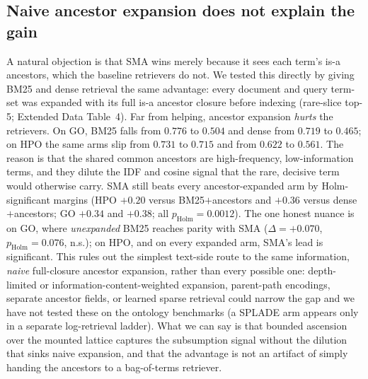\documentclass[pdflatex,sn-nature]{sn-jnl}
\begin{document}
\subsection{Naive ancestor expansion does not explain the gain}
 A natural
objection is that SMA wins merely because it sees each term's is-a ancestors,
which the baseline retrievers do not. We tested this directly by giving BM25 and
dense retrieval the same advantage: every document and query term-set was
expanded with its full is-a ancestor closure before indexing
(rare-slice top-5; Extended Data Table~4). Far from helping, ancestor expansion
\emph{hurts} the retrievers. On GO, BM25 falls from $0.776$ to $0.504$ and dense
from $0.719$ to $0.465$; on HPO the same arms slip from $0.731$ to $0.715$ and
from $0.622$ to $0.561$. The reason is that the shared common ancestors are
high-frequency, low-information terms, and they dilute the IDF and cosine signal
that the rare, decisive term would otherwise carry. SMA still beats every
ancestor-expanded arm by Holm-significant margins (HPO $+0.20$ versus
BM25$+$ancestors and $+0.36$ versus dense$+$ancestors; GO $+0.34$ and $+0.38$;
all $p_{\mathrm{Holm}}{=}0.0012$). The one honest nuance is on GO, where
\emph{unexpanded} BM25 reaches parity with SMA ($\Delta{=}{+}0.070$,
$p_{\mathrm{Holm}}{=}0.076$, n.s.); on HPO, and on every expanded arm, SMA's lead
is significant. This rules out the simplest text-side route to the same
information, \emph{naive} full-closure ancestor expansion, rather than every
possible one: depth-limited or information-content-weighted expansion, parent-path
encodings, separate ancestor fields, or learned sparse retrieval could narrow the
gap and we have not tested these on the ontology benchmarks (a SPLADE arm appears
only in a separate log-retrieval ladder). What we can say is that bounded ascension over the
mounted lattice captures the subsumption signal without the dilution that sinks
naive expansion, and that the advantage is not an artifact of simply handing the
ancestors to a bag-of-terms retriever.
\end{document}
